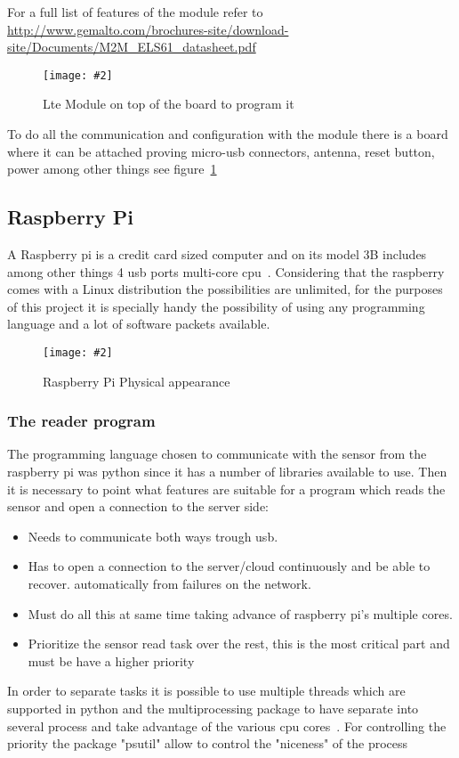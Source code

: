 \documentclass[hidelinks,11pt,a4paper,oneside,article]{memoir}
\newcommand{\putimage}[3][10] %
{
\begin{figure}[h]
	\centering
	\captionsetup{justification=centering}
	\texttt{[image: \#2]}
	\caption{#3}
	\label{fig:#2}
\end{figure}
}
\begin{document}
For a full list of features of the module refer to \url{http://www.gemalto.com/brochures-site/download-site/Documents/M2M_ELS61_datasheet.pdf}


	\putimage{lte_board}{Lte Module on top of the board to program it}
To do all the communication and configuration with the module there is a board where it can be attached proving micro-usb connectors, antenna, reset button, power among other things see figure~\ref{fig:lte_board}





\subsection{Raspberry Pi}
A Raspberry pi is a credit card sized computer and on its model 3B includes among other things 4 \gls{usb} ports multi-core \gls{cpu}~\cite{rpi3}. Considering that the raspberry comes with a Linux distribution the possibilities are unlimited, for the purposes of this project it is specially handy the possibility of using any programming language and a lot of software packets available.

\putimage{raspberry}{Raspberry Pi Physical appearance}

\subsubsection{The reader program}
The programming language chosen to communicate with the sensor from the raspberry pi was \gls{python} since it has a number of libraries available to use. Then it is necessary to point what features are suitable for a program which reads the sensor and open a connection to the server side:
\begin{itemize}
    \item Needs to communicate both ways trough \gls{usb}.
    \item Has to open a connection to the server/cloud continuously and be able to recover. automatically from failures on the network.
    \item Must do all this at same time taking advance of raspberry pi's multiple cores.
    \item Prioritize the sensor read task over the rest, this is the most critical part and must be have a higher priority

    
\end{itemize}

In order to separate tasks it is possible to use multiple threads which are supported in \gls{python} and the multiprocessing package to have separate into several process and take advantage of the various \gls{cpu} cores~\cite{python-multi}. For controlling the priority the package "psutil" allow to control the "niceness" of the process~\cite{python-psutil}
\end{document}
